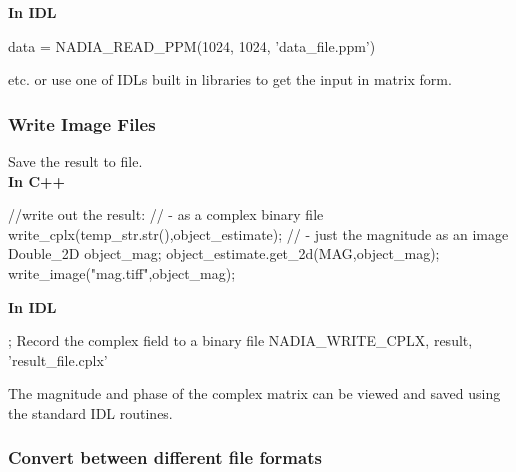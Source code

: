 \documentclass[]{nadia}
\begin{document}
{\bf In IDL}
\begin{myverbatim}[language=IDL]
   data = NADIA_READ_PPM(1024, 1024, 'data_file.ppm')
\end{myverbatim}
etc. or use one of IDLs built in libraries to get
the input in matrix form.


\subsubsection{Write Image Files}
\label{subsub:write_images}
Save the result to file.\\
                          
{\bf In C++} 
\begin{myverbatim}[language=C++]
  //write out the result:
  // - as a complex binary file
  write_cplx(temp_str.str(),object_estimate);
  // - just the magnitude as an image
  Double_2D object_mag;
  object_estimate.get_2d(MAG,object_mag);
  write_image("mag.tiff",object_mag);
\end{myverbatim}
                          
{\bf In IDL}
\begin{myverbatim}[language=IDL]
  ; Record the complex field to a binary file
  NADIA_WRITE_CPLX, result, 'result_file.cplx'
\end{myverbatim}
The magnitude and phase of the complex matrix
can be viewed and saved using the standard IDL
routines.


\subsubsection{Convert between different file formats}
\end{document}
